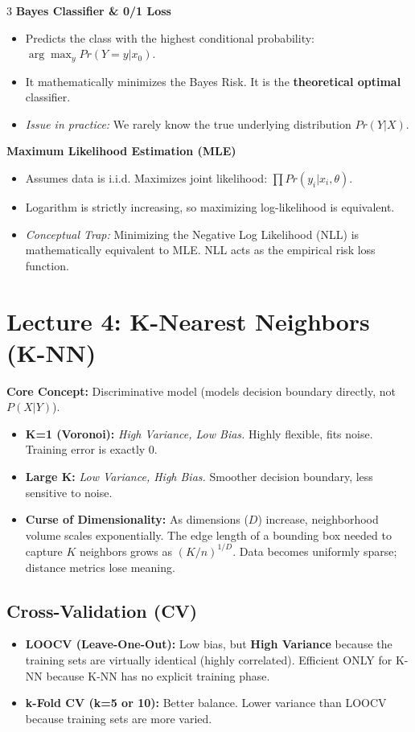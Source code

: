 \documentclass[10pt,landscape]{article}
\begin{document}
\begin{multicols*}{3}
\textbf{Bayes Classifier \& 0/1 Loss}
\begin{itemize}
    \item Predicts the class with the highest conditional probability: $\arg\max_y Pr(Y=y|x_0)$.
    \item It mathematically minimizes the Bayes Risk. It is the \textbf{theoretical optimal} classifier.
    \item \textit{Issue in practice:} We rarely know the true underlying distribution $Pr(Y|X)$.
\end{itemize}

\textbf{Maximum Likelihood Estimation (MLE)}
\begin{itemize}
    \item Assumes data is i.i.d. Maximizes joint likelihood: $\prod Pr(y_i | x_i, \theta)$.
    \item Logarithm is strictly increasing, so maximizing log-likelihood is equivalent.
    \item \textit{Conceptual Trap:} Minimizing the Negative Log Likelihood (NLL) is mathematically equivalent to MLE. NLL acts as the empirical risk loss function.
\end{itemize}

\section*{Lecture 4: K-Nearest Neighbors (K-NN)}
\textbf{Core Concept:} Discriminative model (models decision boundary directly, not $P(X|Y)$).
\begin{itemize}
    \item \textbf{K=1 (Voronoi):} \textit{High Variance, Low Bias.} Highly flexible, fits noise. Training error is exactly 0.
    \item \textbf{Large K:} \textit{Low Variance, High Bias.} Smoother decision boundary, less sensitive to noise.
    \item \textbf{Curse of Dimensionality:} As dimensions ($D$) increase, neighborhood volume scales exponentially. The edge length of a bounding box needed to capture $K$ neighbors grows as $(K/n)^{1/D}$. Data becomes uniformly sparse; distance metrics lose meaning.
\end{itemize}

\subsection*{Cross-Validation (CV)}
\begin{itemize}
    \item \textbf{LOOCV (Leave-One-Out):} Low bias, but \textbf{High Variance} because the training sets are virtually identical (highly correlated). Efficient ONLY for K-NN because K-NN has no explicit training phase.
    \item \textbf{k-Fold CV (k=5 or 10):} Better balance. Lower variance than LOOCV because training sets are more varied.
\end{itemize}


\end{multicols*}
\end{document}
